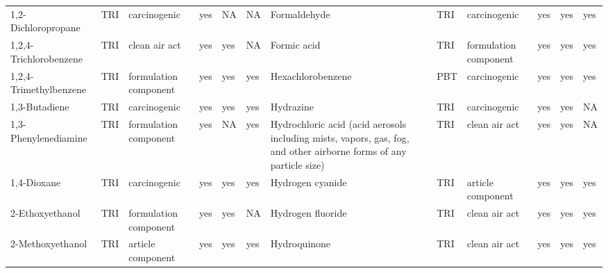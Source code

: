 \begin{table}[H]
{\begin{tabular}{llllllllllll}
            1,2-Dichloropropane                                                        & TRI            & carcinogenic          & yes    & NA      & NA   & Formaldehyde                                                                                                       & TRI            & carcinogenic          & yes & yes & yes\\
            1,2,4-Trichlorobenzene                                                     & TRI            & clean air act         & yes    & yes     & NA   & Formic acid                                                                                                        & TRI            & formulation component & yes & yes & yes\\
            1,2,4-Trimethylbenzene                                                     & TRI            & formulation component & yes    & yes     & yes  & Hexachlorobenzene                                                                                                  & PBT & carcinogenic & yes & yes & yes\\
            1,3-Butadiene                                                              & TRI            & carcinogenic          & yes    & yes     & yes  & Hydrazine                                                                                                          & TRI            & carcinogenic          & yes    & yes     & NA   \\
            1,3-Phenylenediamine                                                       & TRI            & formulation component & yes    & NA      & yes  & Hydrochloric acid (acid aerosols including mists, vapors, gas, fog, and other airborne forms of any particle size) & TRI & clean air act & yes & yes & NA\\
            1,4-Dioxane                                                                & TRI            & carcinogenic          & yes    & yes     & yes  & Hydrogen cyanide                                                                                                   & TRI            & article component     & yes & yes & yes\\
            2-Ethoxyethanol                                                            & TRI            & formulation component & yes    & yes     & NA   & Hydrogen fluoride                                                                                                  & TRI            & clean air act & yes & yes & yes\\
            2-Methoxyethanol                                                           & TRI            & article component     & yes    & yes     & yes  & Hydroquinone                                                                                                       & TRI            & clean air act & yes & yes & yes\\

\end{tabular}}
\end{table}
